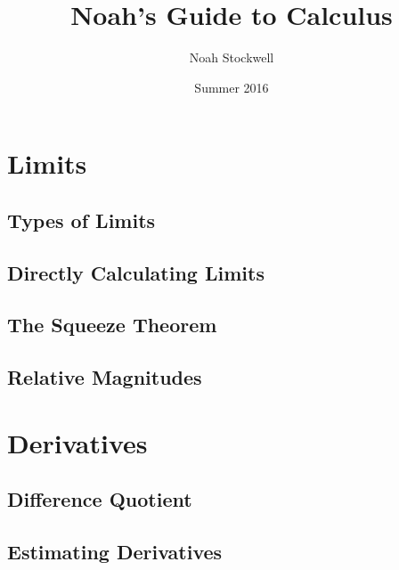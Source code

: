 \documentclass{article}
\title{Noah's Guide to Calculus}
\author{Noah Stockwell}
\date{Summer 2016}
\begin{document}
\maketitle
\vspace{2in}
\begin{center}\end{center}
\newpage
\tableofcontents
\newpage

\section{Limits} 
\subsection{Types of Limits}  
\subsection{Directly Calculating Limits} 
\subsection{The Squeeze Theorem} 
\subsection{Relative Magnitudes} 
\section{Derivatives} 
\subsection{Difference Quotient} 
\subsection{Estimating Derivatives}
\end{document}
